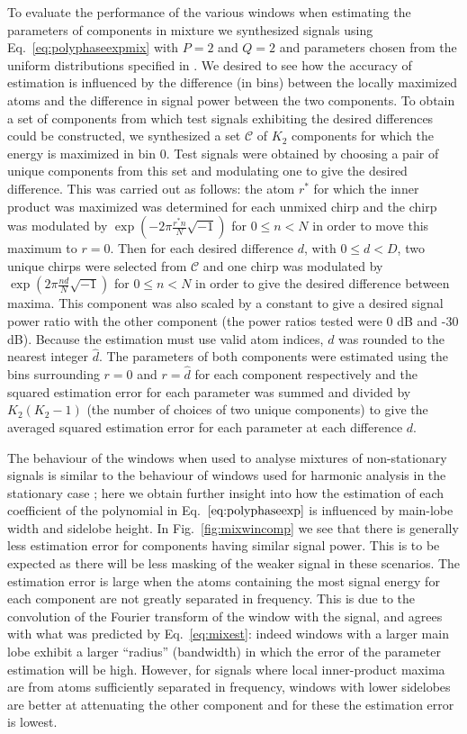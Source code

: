 \documentclass[twoside,a4paper]{article}
\begin{document}
To evaluate the performance of the various windows when estimating the
parameters of components in mixture we synthesized signals using
Eq.~\ref{eq:polyphaseexpmix} with $P=2$ and $Q=2$ and parameters chosen from the
uniform distributions specified in \cite{betser2009sinusoidal}.  We desired to
see how the accuracy of estimation is influenced by the difference (in bins)
between the locally maximized atoms and the difference in signal power between
the two components. To obtain a set of components from which test signals
exhibiting the desired differences could be constructed, we synthesized a set
$\mathcal{C}$ of $K_{2}$ components for which the energy is maximized in bin 0.
Test signals were obtained by choosing a pair of unique components from this set
and modulating one to give the desired difference.  This was carried out as
follows: the atom $r^{\ast}$ for which the inner product was maximized was
determined for each unmixed chirp and the chirp was modulated by $\exp(-2\pi
\frac{r^{\ast} n}{N}\sqrt{-1})$ for $0 \leq n < N$ in order to move this maximum
to $r=0$. Then for each desired difference $d$, with $0 \leq d < D$, two unique
chirps were selected from $\mathcal{C}$ and one chirp was modulated by
$\exp(2\pi \frac{n d}{N}\sqrt{-1})$ for $0 \leq n < N$ in order to give the
desired difference between maxima. This component was also scaled by a constant
to give a desired signal power ratio with the other component (the power ratios
tested were 0 dB and -30 dB). Because the estimation must use valid atom
indices, $d$ was rounded to the nearest integer $\hat{d}$. The parameters of
both components were estimated using the bins surrounding $r=0$ and $r=\hat{d}$ for
each component respectively and the squared estimation error for each parameter
was summed and divided by $K_{2}(K_{2}-1)$ (the number of choices of two unique
components) to give the averaged squared estimation error for each parameter at
each difference $d$.

The behaviour of the windows when used to analyse mixtures of non-stationary
signals is similar to the behaviour of windows used for harmonic analysis in the
stationary case \cite{harris1978use}; here we obtain further insight into how
the estimation of each coefficient of the polynomial in
Eq.~$\ref{eq:polyphaseexp}$ is influenced by main-lobe width and sidelobe
height. In Fig.~\ref{fig:mixwincomp} we see that there is generally less
estimation error for components having similar signal power. This is to be
expected as there will be less masking of the weaker signal in these scenarios.
The estimation error is large when the atoms containing the most signal energy
for each component are not greatly separated in frequency.  This is due to the
convolution of the Fourier transform of the window with the signal, and agrees
with what was predicted by Eq.~\ref{eq:mixest}: indeed windows with a larger
main lobe exhibit a larger ``radius'' (bandwidth) in which the error of the
parameter estimation will be high.  However, for signals where local
inner-product maxima are from atoms sufficiently separated in frequency, windows
with lower sidelobes are better at attenuating the other component and for these
the estimation error is lowest.
\end{document}
